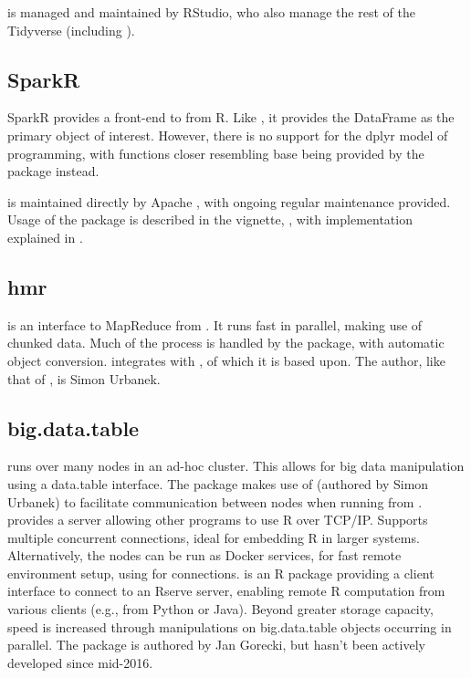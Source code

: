  is managed and maintained by RStudio, who also manage the rest
of the Tidyverse (including ).

\subsection{SparkR}\label{subsec:sparkr}

SparkR provides a front-end to  from R\cite{venkataraman20:_spark}.
Like , it provides the DataFrame as the primary object of interest.
However, there is no support for the dplyr model of programming, with functions closer resembling base \R{} being provided by the package instead.

 is maintained directly by Apache , with ongoing regular
maintenance provided.
Usage of the package is described in the vignette, \textcite{venktaraman19:spark-pract-guide}, with implementation explained in \cite{venkataraman2016sparkr}.

\subsection{hmr}\label{subsec:hmr}

 is an interface to MapReduce from \R{}\cite{urbanek20}.
It runs fast in parallel, making use of chunked data.
Much of the process is handled by the package, with automatic \R{} object conversion.
 integrates with
, of which it is based upon.
The author, like that of , is Simon Urbanek.

\subsection{big.data.table}\label{subsec:big.data.table}

 runs  over many nodes in an ad-hoc
cluster\cite{gorecki16}.
This allows for big data manipulation using a data.table interface.
The package makes use of  (authored by Simon Urbanek) to facilitate communication between nodes when running from \R{}\cite{urbanek2003rserve}.
 provides a server allowing other programs to use R over TCP/IP. Supports multiple concurrent connections, ideal for embedding R in larger systems.
Alternatively, the nodes can be run as Docker services, for fast remote environment setup, using  for connections\cite{rsclient}.
 is an R package providing a client interface to connect to an Rserve server, enabling remote R computation from various clients (e.g., from Python or Java).
Beyond greater storage capacity, speed is increased through manipulations on big.data.table objects occurring in parallel.
The package is authored by Jan Gorecki, but hasn't been actively developed since mid-2016.
